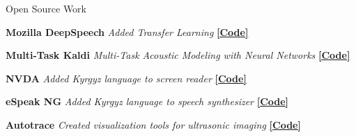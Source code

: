 \documentclass{resume} %
\begin{document}
\begin{rSection}{Open Source Work}

{\textbf{Mozilla DeepSpeech}} {\hfill \textit{Added Transfer Learning} {\hspace{2.5cm} \href{https://github.com/mozilla/DeepSpeech/releases/tag/v0.7.0}{\textbf{[Code]}}}} \\\vspace{-.35cm}

{\textbf{Multi-Task Kaldi}} {\hfill \textit{Multi-Task Acoustic Modeling with Neural Networks} {\hspace{2.5cm} \href{https://github.com/JRMeyer/multi-task-kaldi}{\textbf{[Code]}}}} \\\vspace{-.35cm}

{\textbf{NVDA}} {\hfill \textit{Added Kyrgyz language to screen reader} {\hspace{2.5cm} \href{https://github.com/JRMeyer/nvda}{\textbf{[Code]}}}} \\\vspace{-.35cm}

{\textbf{eSpeak NG}} {\hfill \textit{Added Kyrgyz language to speech synthesizer} {\hspace{2.5cm} \href{https://github.com/rhdunn/espeak/commits?author=JRMeyer}{\textbf{[Code]}}}}\\\vspace{-.35cm}

{\textbf{Autotrace}} {\hfill \textit{Created visualization tools for ultrasonic imaging} {\hspace{2.5cm} \href{https://github.com/JRMeyer/Autotrace}{\textbf{[Code]}}}} \\
\end{rSection}



\vspace{.25cm}
\end{document}
